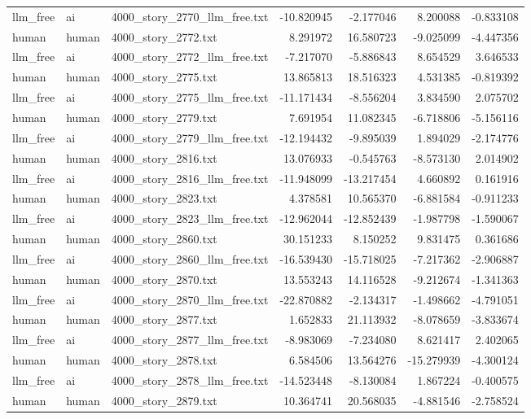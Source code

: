 \begin{longtable}{lllrrrr}
llm\_free & ai & 4000\_story\_2770\_llm\_free.txt & -10.820945 & -2.177046 & 8.200088 & -0.833108 \\
human & human & 4000\_story\_2772.txt & 8.291972 & 16.580723 & -9.025099 & -4.447356 \\
llm\_free & ai & 4000\_story\_2772\_llm\_free.txt & -7.217070 & -5.886843 & 8.654529 & 3.646533 \\
human & human & 4000\_story\_2775.txt & 13.865813 & 18.516323 & 4.531385 & -0.819392 \\
llm\_free & ai & 4000\_story\_2775\_llm\_free.txt & -11.171434 & -8.556204 & 3.834590 & 2.075702 \\
human & human & 4000\_story\_2779.txt & 7.691954 & 11.082345 & -6.718806 & -5.156116 \\
llm\_free & ai & 4000\_story\_2779\_llm\_free.txt & -12.194432 & -9.895039 & 1.894029 & -2.174776 \\
human & human & 4000\_story\_2816.txt & 13.076933 & -0.545763 & -8.573130 & 2.014902 \\
llm\_free & ai & 4000\_story\_2816\_llm\_free.txt & -11.948099 & -13.217454 & 4.660892 & 0.161916 \\
human & human & 4000\_story\_2823.txt & 4.378581 & 10.565370 & -6.881584 & -0.911233 \\
llm\_free & ai & 4000\_story\_2823\_llm\_free.txt & -12.962044 & -12.852439 & -1.987798 & -1.590067 \\
human & human & 4000\_story\_2860.txt & 30.151233 & 8.150252 & 9.831475 & 0.361686 \\
llm\_free & ai & 4000\_story\_2860\_llm\_free.txt & -16.539430 & -15.718025 & -7.217362 & -2.906887 \\
human & human & 4000\_story\_2870.txt & 13.553243 & 14.116528 & -9.212674 & -1.341363 \\
llm\_free & ai & 4000\_story\_2870\_llm\_free.txt & -22.870882 & -2.134317 & -1.498662 & -4.791051 \\
human & human & 4000\_story\_2877.txt & 1.652833 & 21.113932 & -8.078659 & -3.833674 \\
llm\_free & ai & 4000\_story\_2877\_llm\_free.txt & -8.983069 & -7.234080 & 8.621417 & 2.402065 \\
human & human & 4000\_story\_2878.txt & 6.584506 & 13.564276 & -15.279939 & -4.300124 \\
llm\_free & ai & 4000\_story\_2878\_llm\_free.txt & -14.523448 & -8.130084 & 1.867224 & -0.400575 \\
human & human & 4000\_story\_2879.txt & 10.364741 & 20.568035 & -4.881546 & -2.758524 \\

\end{longtable}
